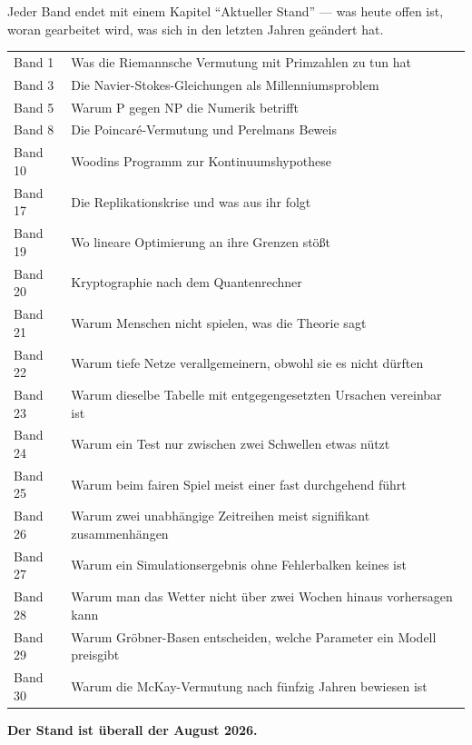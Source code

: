\begin{merksatz}
Jeder Band endet mit einem Kapitel \enquote{Aktueller Stand} --- was heute offen ist, woran gearbeitet wird, was sich in den letzten Jahren geändert hat.

\begin{center}
{\small
\renewcommand{\arraystretch}{1.46}
\begin{tabular}{@{}P{1.8cm}P{6.4cm}@{}}
\toprule
Band 1 & Was die Riemannsche Vermutung mit Primzahlen zu tun hat\\
Band 3 & Die Navier-Stokes-Gleichungen als Millenniumsproblem\\
Band 5 & Warum P gegen NP die Numerik betrifft\\
Band 8 & Die Poincaré-Vermutung und Perelmans Beweis\\
Band 10 & Woodins Programm zur Kontinuumshypothese\\
Band 17 & Die Replikationskrise und was aus ihr folgt\\
Band 19 & Wo lineare Optimierung an ihre Grenzen stößt\\
Band 20 & Kryptographie nach dem Quantenrechner\\
Band 21 & Warum Menschen nicht spielen, was die Theorie sagt\\
Band 22 & Warum tiefe Netze verallgemeinern, obwohl sie es nicht dürften\\
Band 23 & Warum dieselbe Tabelle mit entgegengesetzten Ursachen vereinbar ist\\
Band 24 & Warum ein Test nur zwischen zwei Schwellen etwas nützt\\
Band 25 & Warum beim fairen Spiel meist einer fast durchgehend führt\\
Band 26 & Warum zwei unabhängige Zeitreihen meist signifikant zusammenhängen\\
Band 27 & Warum ein Simulationsergebnis ohne Fehlerbalken keines ist\\
Band 28 & Warum man das Wetter nicht über zwei Wochen hinaus vorhersagen kann\\
Band 29 & Warum Gröbner-Basen entscheiden, welche Parameter ein Modell preisgibt\\
Band 30 & Warum die McKay-Vermutung nach fünfzig Jahren bewiesen ist\\
\bottomrule
\end{tabular}}
\end{center}

\begin{center}
\begin{minipage}{0.9\textwidth}
\textbf{Der Stand ist überall der August 2026.}
\end{minipage}
\end{center}

\begin{center}
\begin{minipage}{0.88\textwidth}
\end{minipage}
\end{center}
\end{merksatz}

